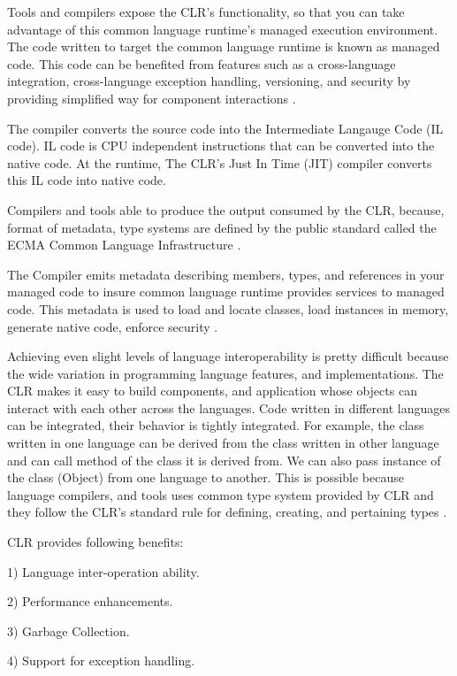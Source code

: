 Tools and compilers expose the CLR's functionality, so that you can take advantage of this common language runtime's managed execution environment. The code written to target the common language runtime is known as managed code. This code can be benefited from features such as a cross-language integration, cross-language exception handling, versioning, and security by providing simplified way for component interactions \cite{commonlanguageruntime}.

The compiler converts the source code into the Intermediate Langauge Code (IL code). IL code is CPU independent instructions that can be converted into the native code. At the runtime, The CLR's Just In Time (JIT) compiler converts this IL code into native code.

Compilers and tools able to produce the output consumed by the CLR, because, format of metadata, type systems are defined by the public standard called the ECMA Common Language Infrastructure \cite{Gough:2001:CNC:559569}.

The Compiler emits metadata describing members, types, and references in your managed code to insure common language runtime provides services to managed code. This metadata is used to load and locate classes, load instances in memory, generate native code, enforce security \cite{Gough:2001:CNC:559569}.

Achieving even slight levels of language interoperability is pretty difficult because the wide variation in programming language features, and implementations. The CLR makes it easy to build components, and application whose objects can interact with each other across the languages. Code written in different languages can be integrated, their behavior is tightly integrated. For example, the class written in one language can be derived from the class written in other language and can call method of the class it is derived from. We can also pass instance of the class (Object) from one language to another. This is possible because language compilers, and tools uses common type system provided by CLR and they follow the CLR’s standard rule for defining, creating, and pertaining types \cite{Kennedy:2001:DIG:381694.378797}.


CLR provides following benefits: 

1) Language inter-operation ability.

2) Performance enhancements.

3) Garbage Collection.

4) Support for exception handling.


